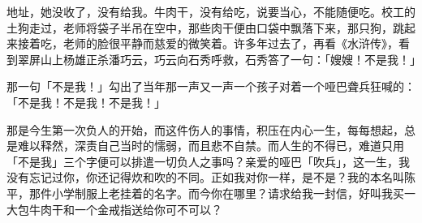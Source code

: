 \documentclass[UTF8]{ctexart}
\begin{document}
地址，她没收了，没有给我。牛肉干，没有给吃，说要当心，不能随便吃。校工的土狗走过，老师将袋子半吊在空中，那些肉干便由口袋中飘落下来，那只狗，跳起来接着吃，老师的脸很平静而慈爱的微笑着。许多年过去了，再看《水浒传》，看到翠屏山上杨雄正杀潘巧云，巧云向石秀呼救，石秀答了一句：「嫂嫂！不是我！」

那一句「不是我！」勾出了当年那一声又一声一个孩子对着一个哑巴聋兵狂喊的：「不是我！不是我！不是我！」

那是今生第一次负人的开始，而这件伤人的事情，积压在内心一生，每每想起，总是难以释然，深责自己当时的懦弱，而且悲不自禁。而人生的不得已，难道只用「不是我」三个字便可以排遣一切负人之事吗？亲爱的哑巴「吹兵」，这一生，我没有忘记过你，你还记得炊和吹的不同。正如我对你一样，是不是？我的本名叫陈平，那件小学制服上老挂着的名字。而今你在哪里？请求给我一封信，好叫我买一大包牛肉干和一个金戒指送给你可不可以？
　
\end{document}
